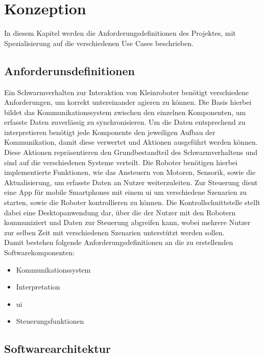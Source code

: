\color{finishing}

\section{Konzeption}

In diesem Kapitel werden die Anforderungsdefinitionen des Projektes, mit Spezialisierung auf die verschiedenen Use Cases beschrieben.

\subsection{Anforderunsdefinitionen}

Ein Schwarmverhalten zur Interaktion von Kleinroboter benötigt verschiedene Anforderungen, um korrekt untereinander agieren zu können. Die Basis hierbei bildet das Kommunikationssystem zwischen den einzelnen Komponenten, um erfasste Daten zuverlässig zu synchronisieren. Um die Daten entsprechend zu interpretieren benötigt jede Komponente den jeweiligen Aufbau der Kommunikation, damit diese verwertet und Aktionen ausgeführt werden können.\\
Diese Aktionen repräsentieren den Grundbestandteil des Schwarmverhaltens und sind auf die verschiedenen Systeme verteilt. Die Roboter benötigen hierbei implementierte Funktionen, wie das Ansteuern von Motoren, Sensorik, sowie die Aktualisierung, um erfasste Daten an Nutzer weiterzuleiten. Zur Steuerung dient eine App für mobile Smartphones mit einem \gls{ui} um verschiedene Szenarien zu starten, sowie die Roboter kontrollieren zu können. Die Kontrollschnittstelle stellt dabei eine Desktopanwendung dar, über die der Nutzer mit den Robotern kommuniziert und Daten zur Steuerung abgreifen kann, wobei mehrere Nutzer zur selben Zeit mit verschiedenen Szenarien unterstützt werden sollen.\\

\noindent
Damit bestehen folgende Anforderungsdefinitionen an die zu erstellenden Softwarekomponenten:
\begin{itemize}
	\item Kommunikationssystem
	\item Interpretation
	\item \gls{ui}
	\item Steuerungsfunktionen
\end{itemize}

\color{process}
\newpage
\subsection{Softwarearchitektur}


